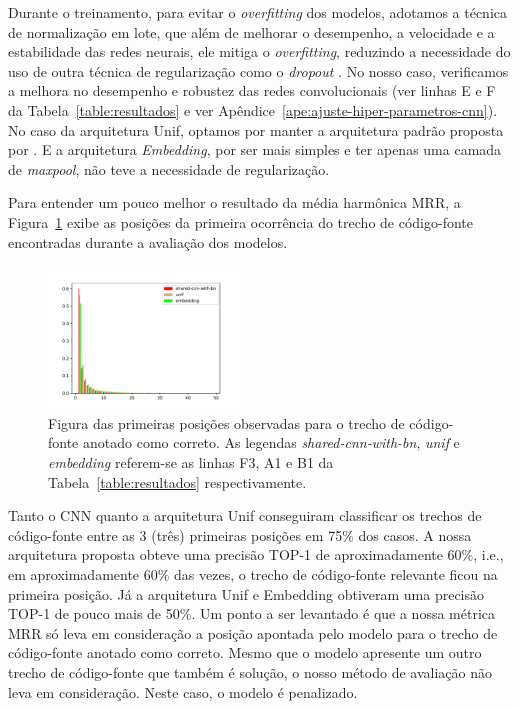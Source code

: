 \documentclass[sigconf]{acmart}
\begin{document}
Durante o treinamento, para evitar o \textit{overfitting} dos modelos, adotamos a técnica de normalização em lote, que além de melhorar o desempenho, a velocidade e a estabilidade das redes neurais, ele mitiga o \textit{overfitting}, reduzindo a necessidade do uso de outra técnica de regularização como o \textit{dropout} \citep{sergey-batch-normalization-2015}. No nosso caso, verificamos a melhora no desempenho e robustez das redes convolucionais (ver linhas E e F da Tabela~\ref{table:resultados} e ver Apêndice~\ref{ape:ajuste-hiper-parametros-cnn}). No caso da arquitetura Unif, optamos por manter a arquitetura padrão proposta por \cite{cambronero-deep-learning-code-search:2019}. E a arquitetura \textit{Embedding}, por ser mais simples e ter apenas uma camada de \textit{maxpool}, não teve a necessidade de regularização.


Para entender um pouco melhor o resultado da média harmônica MRR, a Figura~\ref{fig:histogram-mrr} exibe as posições da primeira ocorrência do trecho de código-fonte encontradas durante a avaliação dos modelos.

\begin{figure}[H]
    \centering
    \includegraphics[width=0.45\textwidth]{figuras/histogram.pdf}
    \caption{Figura das primeiras posições observadas para o trecho de código-fonte anotado como correto. As legendas \emph{shared-cnn-with-bn}, \emph{unif} e \emph{embedding} referem-se as linhas F3, A1 e B1 da Tabela~\ref{table:resultados} respectivamente.}
    \label{fig:histogram-mrr}
\end{figure}


Tanto o CNN quanto a arquitetura Unif conseguiram classificar os trechos de código-fonte entre as 3 (três) primeiras posições em 75\% dos casos. A nossa arquitetura proposta obteve uma precisão TOP-1 de aproximadamente 60\%, i.e., em aproximadamente 60\% das vezes, o trecho de código-fonte relevante ficou na primeira posição. Já a arquitetura Unif e Embedding obtiveram uma precisão TOP-1 de pouco mais de 50\%. Um ponto a ser levantado é que a nossa métrica MRR só leva em consideração a posição apontada pelo modelo para o trecho de código-fonte anotado como correto. Mesmo que o modelo apresente um outro trecho de código-fonte que também é solução, o nosso método de avaliação não leva em consideração. Neste caso, o modelo é penalizado.
\end{document}
